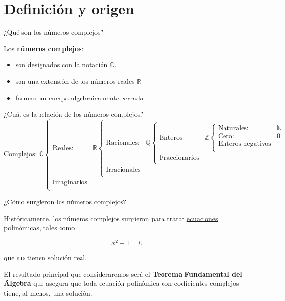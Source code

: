 
\section{Definición y origen}

\begin{frame}[c]{¿Qué son los números complejos?}

  Los \textbf{números complejos}:

  \begin{itemize}
    \item son designados con la notación $\mathbb{C}$.
    \pausa
    \item son una extensión de los números reales $\mathbb{R}$.
    \pausa
    \item forman un cuerpo algebraicamente cerrado.
  \end{itemize}
\end{frame}

\begin{frame}[c]{¿Cuál es la relación de los números complejos?}
  \[
    \text{Complejos: }\mathbb{C} \begin{cases}
      \text{Reales:} & \mathbb{R} \begin{cases}
        \text{Racionales:} & \mathbb{Q} \begin{cases}
          \text{Enteros:} & \mathbb{Z} \begin{cases}
            \text{Naturales:} & \mathbb{N} \\
            \text{Cero:} & 0 \\
            \text{Enteros negativos} & \\
            \end{cases} \\
          \text{Fraccionarios} &  \\
          \end{cases} \\
        \text{Irracionales} &  \\
        \end{cases} \\
      \text{Imaginarios} & \\
    \end{cases}
  \]
\end{frame}

\begin{frame}[c]{¿Cómo surgieron los números complejos?}

  Históricamente, los números complejos surgieron para tratar
  \underline{ecuaciones polinómicas}, tales como

  \begin{displaymath}
    x^2 + 1 = 0
  \end{displaymath}

  que \textbf{no} tienen solución real.

  \vspace{\baselineskip}
  El resultado principal que consideraremos será el
  \textbf{Teorema Fundamental del Álgebra} que asegura que toda
  ecuación polinómica con coeficientes complejos tiene, al menos,
  una solución.
\end{frame}

